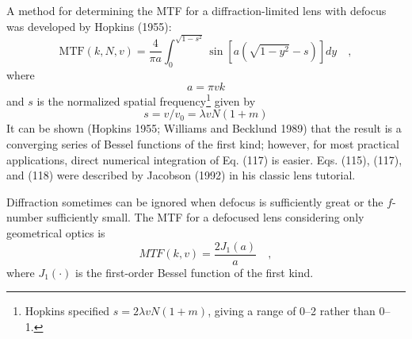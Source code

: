 \documentclass[11pt, oneside]{scrartcl}   	%
\begin{document}
                                                               
A method for determining the MTF for a diffraction-limited lens with defocus was developed by Hopkins (1955):
\begin{equation}
   \mathrm{MTF}(k,N,v) = \frac4{\pi a}\int_0^{\sqrt{1-s^2}}\sin \left[a\left(\sqrt{1-y^2} - s \right) \right] dy \quad,
   \label{eq:MTF}
\end{equation}
where
\begin{equation}
 a = πv k
\end{equation}
and $s$ is the normalized spatial frequency\footnote{Hopkins specified $s = 2λvN(1 + m)$, giving a range of 0--2 rather than 0--1.} given by
\begin{equation}
s = v/v_0 = λvN(1+m)
\end{equation}
It can be shown (Hopkins 1955; Williams and Becklund 1989) that the result is a converging series of Bessel functions of the first kind; however, for most practical applications, direct numerical integration of Eq. (117) is easier. Eqs. (115), (117), and (118) were described by Jacobson (1992) in his classic lens tutorial.

Diffraction sometimes can be ignored when defocus is sufficiently great or the $f$-number sufficiently small. The MTF for a defocused lens considering only geometrical optics is
\begin{equation}
   MTF(k,v)= \frac{2J_1(a)}a\quad,
\end{equation}
where $J_1(\cdot)$ is the first-order Bessel function of the first kind.
\end{document}
